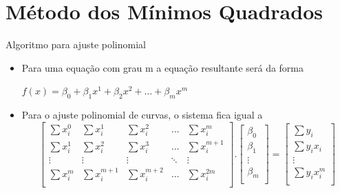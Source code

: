 \documentclass[10pt]{beamer}
\begin{document}
\section{Método dos Mínimos Quadrados}
\begin{frame}[fragile]{Algoritmo para ajuste polinomial}
  \begin{itemize}
  \item Para uma equação com grau m a equação resultante será da forma  \begin{center}$f(x) = \beta_0 + \beta_1x^{1} + \beta_2x^{2} + \dots + \beta_mx^{m}$\newline\end{center}
  
  \item Para o ajuste polinomial de curvas, o sistema fica
igual a   
  \newline
  \[
    \begin{bmatrix}
      \sum{x_{i}^{0}} & \sum{x_{i}^{1}} & \sum{x_{i}^{2}} & \dots  & \sum{x_{i}^{m}} \\
      \sum{x_{i}^{1}} & \sum{x_{i}^{2}} & \sum{x_{i}^{3}} & \dots & \sum{x_{i}^{m+1}}\\
      \vdots & \vdots & \vdots & \ddots & \vdots \\
      \sum{x_{i}^{m}} & \sum{x_{i}^{m+1}} & \sum{x_{i}^{m+2}} & \dots  & \sum{x_{i}^{2m}} \\
    \end{bmatrix}
    .
    \begin{bmatrix}
      \beta_0 \\
      \beta_1 \\
      \vdots  \\
      \beta_m \\
    \end{bmatrix}
    =
    \begin{bmatrix}
      \sum{y_{i}} \\
      \sum{y_{i}x_{i}}\\
      \vdots \\
      \sum{y_{i}x_{i}^{m}} \\
    \end{bmatrix}
  \]
  \newline
  \end{itemize}
\end{frame}
\end{document}
